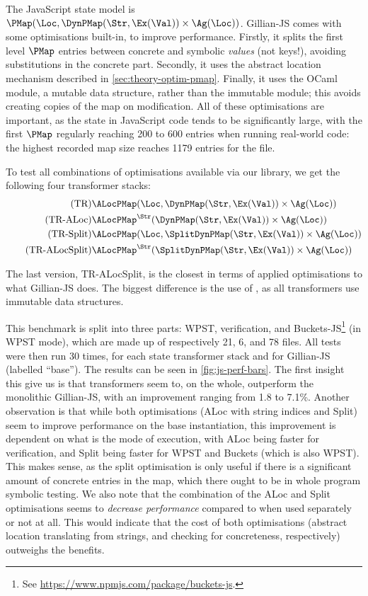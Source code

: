 The JavaScript state model is $\PMap(\Loc, \DynPMap(\Str, \Ex(\Val)) \times \Ag(\Loc))$. Gillian-JS comes with some optimisations built-in, to improve performance. Firstly, it splits the first level $\PMap$ entries between concrete and symbolic \emph{values} (not keys!), avoiding substitutions in the concrete part. Secondly, it uses the abstract location mechanism described in \cref{sec:theory-optim-pmap}. Finally, it uses the OCaml  module, a mutable data structure, rather than the immutable  module; this avoids creating copies of the map on modification. All of these optimisations are important, as the state in JavaScript code tends to be significantly large, with the first $\PMap$ regularly reaching 200 to 600 entries when running real-world code: the highest recorded map size reaches 1179 entries for the  file.

To test all combinations of optimisations available via our library, we get the following four transformer stacks:
\begin{align}
\tag{TR}           & \ALocPMap(\Loc, \DynPMap(\Str, \Ex(\Val)) \times \Ag(\Loc)) \\
\tag{TR-ALoc}      & \ALocPMap^\Str(\DynPMap(\Str, \Ex(\Val)) \times \Ag(\Loc)) \\
\tag{TR-Split}     & \ALocPMap(\Loc, \SplitDynPMap(\Str, \Ex(\Val)) \times \Ag(\Loc)) \\
\tag{TR-ALocSplit} & \ALocPMap^\Str(\SplitDynPMap(\Str, \Ex(\Val)) \times \Ag(\Loc))
 \end{align}

The last version, TR-ALocSplit, is the closest in terms of applied optimisations to what Gillian-JS does. The biggest difference is the use of , as all transformers use immutable data structures. 

This benchmark is split into three parts: WPST, verification, and Buckets-JS\footnote{See \url{https://www.npmjs.com/package/buckets-js}.} (in WPST mode), which are made up of respectively 21, 6, and 78 files. All tests were then run 30 times, for each state transformer stack and for Gillian-JS (labelled ``base''). The results can be seen in \autoref{fig:js-perf-bars}. The first insight this give us is that transformers seem to, on the whole, outperform the monolithic Gillian-JS, with an improvement ranging from 1.8 to 7.1\%. Another observation is that while both optimisations (ALoc with string indices and Split) seem to improve performance on the base instantiation, this improvement is dependent on what is the mode of execution, with ALoc being faster for verification, and Split being faster for WPST and Buckets (which is also WPST). This makes sense, as the split optimisation is only useful if there is a significant amount of concrete entries in the map, which there ought to be in whole program symbolic testing. We also note that the combination of the ALoc and Split optimisations seems to \emph{decrease performance} compared to when used separately or not at all. This would indicate that the cost of both optimisations (abstract location translating from strings, and checking for concreteness, respectively) outweighs the benefits.

